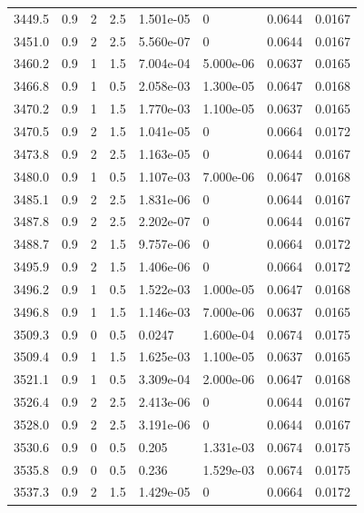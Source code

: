 \documentclass[preview]{standalone}
\begin{document}
{{{{{{{{{{{{\begin{tabular}{L{1.2cm}C{1.2cm} C{0.3cm}C{0.5cm} C{1.4cm}C{1.4cm} C{1.4cm}C{1.4cm}}
  3449.5  &   0.9  & 2     & 2.5 &  1.501e-05  & 0  & 0.0644 &  0.0167   \\ 
  3451.0  &   0.9  & 2     & 2.5 &  5.560e-07  & 0  & 0.0644 &  0.0167   \\ 
  3460.2  &   0.9  & 1     & 1.5 &  7.004e-04  & 5.000e-06  & 0.0637 &  0.0165   \\ 
  3466.8  &   0.9  & 1     & 0.5 &  2.058e-03  & 1.300e-05  & 0.0647 &  0.0168   \\ 
  3470.2  &   0.9  & 1     & 1.5 &  1.770e-03  & 1.100e-05  & 0.0637 &  0.0165   \\ 
  3470.5  &   0.9  & 2     & 1.5 &  1.041e-05  & 0  & 0.0664 &  0.0172   \\ 
  3473.8  &   0.9  & 2     & 2.5 &  1.163e-05  & 0  & 0.0644 &  0.0167   \\ 
  3480.0  &   0.9  & 1     & 0.5 &  1.107e-03  & 7.000e-06  & 0.0647 &  0.0168   \\ 
  3485.1  &   0.9  & 2     & 2.5 &  1.831e-06  & 0  & 0.0644 &  0.0167   \\ 
  3487.8  &   0.9  & 2     & 2.5 &  2.202e-07  & 0  & 0.0644 &  0.0167   \\ 
  3488.7  &   0.9  & 2     & 1.5 &  9.757e-06  & 0  & 0.0664 &  0.0172   \\ 
  3495.9  &   0.9  & 2     & 1.5 &  1.406e-06  & 0  & 0.0664 &  0.0172   \\ 
  3496.2  &   0.9  & 1     & 0.5 &  1.522e-03  & 1.000e-05  & 0.0647 &  0.0168   \\ 
  3496.8  &   0.9  & 1     & 1.5 &  1.146e-03  & 7.000e-06  & 0.0637 &  0.0165   \\ 
  3509.3  &   0.9  & 0     & 0.5 &  0.0247  & 1.600e-04  & 0.0674 &  0.0175   \\ 
  3509.4  &   0.9  & 1     & 1.5 &  1.625e-03  & 1.100e-05  & 0.0637 &  0.0165   \\ 
  3521.1  &   0.9  & 1     & 0.5 &  3.309e-04  & 2.000e-06  & 0.0647 &  0.0168   \\ 
  3526.4  &   0.9  & 2     & 2.5 &  2.413e-06  & 0  & 0.0644 &  0.0167   \\ 
  3528.0  &   0.9  & 2     & 2.5 &  3.191e-06  & 0  & 0.0644 &  0.0167   \\ 
  3530.6  &   0.9  & 0     & 0.5 &  0.205  & 1.331e-03  & 0.0674 &  0.0175   \\ 
  3535.8  &   0.9  & 0     & 0.5 &  0.236  & 1.529e-03  & 0.0674 &  0.0175   \\ 
  3537.3  &   0.9  & 2     & 1.5 &  1.429e-05  & 0  & 0.0664 &  0.0172   \\ 

\end{tabular}}}}}}}}}}}}}
\end{document}
